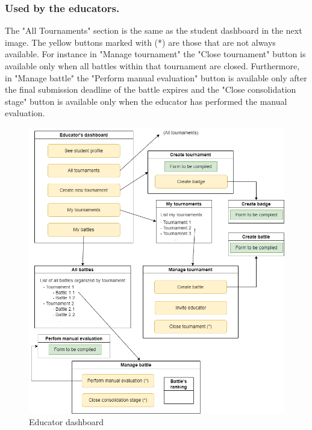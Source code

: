 \subsubsection{Used by the educators.}
The "All Tournaments" section is the same as the student dashboard in the next image. \newline
The yellow buttons marked with (*) are those that are not always available. For instance in "Manage tournament" the "Close tournament" button is available only when all battles within that tournament are closed. Furthermore, in "Manage battle" the "Perform manual evaluation" button is available only after the final submission deadline of the battle expires and the "Close consolidation stage" button is available only when the educator has performed the manual evaluation.
\begin{figure}[H]
    \centering
    \includegraphics[scale=0.5]{images/educator_dashboard.png}
    \caption{Educator dashboard}
    \label{fig:edDash}
\end{figure}

